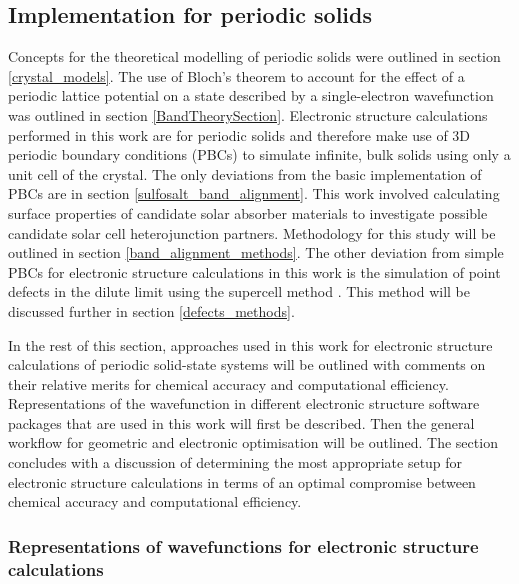 \documentclass[11pt, twoside]{report}
\begin{document}


\subsection{Implementation for periodic solids}

Concepts for the theoretical modelling of periodic solids were outlined in section \ref{crystal_models}. The use of Bloch's theorem to account for the effect of a periodic lattice potential on a state described by a single-electron wavefunction was outlined in section \ref{BandTheorySection}. Electronic structure calculations performed in this work are for periodic solids and therefore make use of 3D periodic boundary conditions (PBCs) to simulate infinite, bulk solids using only a unit cell of the crystal. The only deviations from the basic implementation of PBCs are in section \ref{sulfosalt_band_alignment}. This work involved calculating surface properties of candidate solar absorber materials to investigate possible candidate solar cell heterojunction partners. Methodology for this study will be outlined in section \ref{band_alignment_methods}. The other deviation from simple PBCs for electronic structure calculations in this work is the simulation of point defects in the dilute limit using the supercell method \cite{SupercellMethodDefects}. This method will be discussed further in section \ref{defects_methods}. 

In the rest of this section, approaches used in this work for electronic structure calculations of periodic solid-state systems will be outlined with comments on their relative merits for chemical accuracy and computational efficiency. Representations of the wavefunction in different electronic structure software packages that are used in this work will first be described. Then the general workflow for geometric and electronic optimisation will be outlined. The section concludes with a discussion of determining the most appropriate setup for electronic structure calculations in terms of an optimal compromise between chemical accuracy and computational efficiency.



\subsubsection{Representations of wavefunctions for electronic structure calculations}
\end{document}
